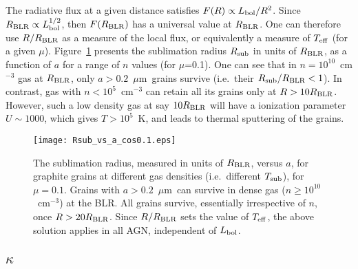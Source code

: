 \documentclass[a4paper,fleqn,usenatbib]{mnras}
\newcommand{\mic}{\mbox{$\mu$m}}
\newcommand{\Tsub}{\mbox{$T_{\rm sub}$}}
\begin{document}
The radiative flux at a given distance satisfies $F(R) \propto L_{\rm bol}/R^2$. Since
 $R_{\rm BLR}\propto L_{\rm bol}^{1/2}$, then $F(R_{\rm BLR})$ has a universal value
at $R_{\rm BLR}$.
One can therefore use $R/R_{\rm BLR}$ as a measure of the local flux, or equivalently
a measure of $T_{\rm eff}$ (for a given $\mu$).  
Figure~\ref{fig:Rsub_vs_a} presents the sublimation radius $R_{\rm sub}$ in units of $R_{\rm BLR}$,
as a function of $a$ for a range of $n$ values (for $\mu$=0.1). 
One can see that in $n=10^{10}$~cm$^{-3}$ gas at $R_{\rm BLR}$, only $a>0.2$~\mic\ grains survive 
(i.e.\ their $R_{\rm sub}/R_{\rm BLR}<1$). In contrast, gas with $n<10^5$~cm$^{-3}$
can retain all its grains only at $R>10R_{\rm BLR}$. However, such a low density gas at say $10R_{\rm BLR}$
will have a ionization parameter $U\sim 1000$, which gives $T> 10^5$~K, and leads to thermal sputtering of the grains.  



\begin{figure}
\texttt{[image: Rsub\_vs\_a\_cos0.1.eps]}
\caption{The sublimation radius, measured in units of $R_{\rm BLR}$, versus $a$, for graphite grains 
at different gas densities (i.e.\ different \Tsub), for $\mu=0.1$.
Grains with $a>0.2$~\mic\ can survive in dense gas ($n\ge 10^{10}$~cm$^{-3}$) at the BLR. 
All grains survive, essentially irrespective of $n$, once $R>20R_{\rm BLR}$.
Since $R/R_{\rm BLR}$ sets the value of $T_{\rm eff}$, the above solution applies in all AGN, independent of 
$L_{\rm bol}$.
}
\label{fig:Rsub_vs_a}
\end{figure}
	
	

\subsection{$\kappa$}\label{sec:dust_op}
	
\end{document}
